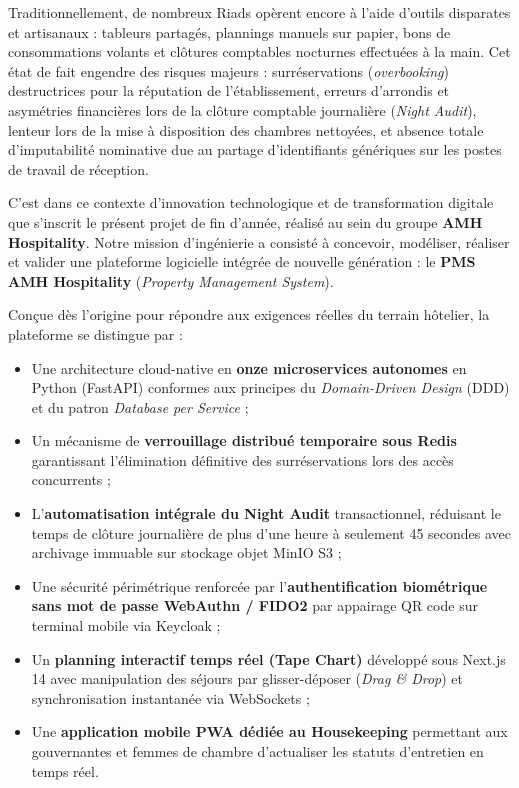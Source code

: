 \documentclass[12pt,a4paper,oneside]{report}
\begin{document}
Traditionnellement, de nombreux Riads opèrent encore à l'aide d'outils disparates et artisanaux : tableurs partagés, plannings manuels sur papier, bons de consommations volants et clôtures comptables nocturnes effectuées à la main. Cet état de fait engendre des risques majeurs : surréservations (\textit{overbooking}) destructrices pour la réputation de l'établissement, erreurs d'arrondis et asymétries financières lors de la clôture comptable journalière (\textit{Night Audit}), lenteur lors de la mise à disposition des chambres nettoyées, et absence totale d'imputabilité nominative due au partage d'identifiants génériques sur les postes de travail de réception.

C'est dans ce contexte d'innovation technologique et de transformation digitale que s'inscrit le présent projet de fin d'année, réalisé au sein du groupe \textbf{AMH Hospitality}. Notre mission d'ingénierie a consisté à concevoir, modéliser, réaliser et valider une plateforme logicielle intégrée de nouvelle génération : le \textbf{PMS AMH Hospitality} (\textit{Property Management System}).

Conçue dès l'origine pour répondre aux exigences réelles du terrain hôtelier, la plateforme se distingue par :
\begin{itemize}
    \item Une architecture cloud-native en \textbf{onze microservices autonomes} en Python (FastAPI) conformes aux principes du \textit{Domain-Driven Design} (DDD) et du patron \textit{Database per Service} ;
    \item Un mécanisme de \textbf{verrouillage distribué temporaire sous Redis} garantissant l'élimination définitive des surréservations lors des accès concurrents ;
    \item L'\textbf{automatisation intégrale du Night Audit} transactionnel, réduisant le temps de clôture journalière de plus d'une heure à seulement 45 secondes avec archivage immuable sur stockage objet MinIO S3 ;
    \item Une sécurité périmétrique renforcée par l'\textbf{authentification biométrique sans mot de passe WebAuthn / FIDO2} par appairage QR code sur terminal mobile via Keycloak ;
    \item Un \textbf{planning interactif temps réel (Tape Chart)} développé sous Next.js 14 avec manipulation des séjours par glisser-déposer (\textit{Drag \& Drop}) et synchronisation instantanée via WebSockets ;
    \item Une \textbf{application mobile PWA dédiée au Housekeeping} permettant aux gouvernantes et femmes de chambre d'actualiser les statuts d'entretien en temps réel.
\end{itemize}
\end{document}
